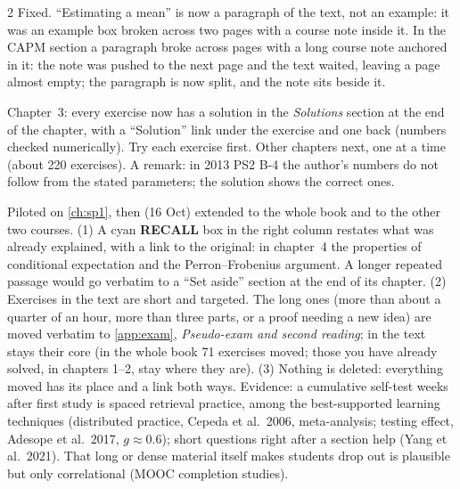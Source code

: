 \begin{paracol}{2}
{Fixed. ``Estimating a mean'' is now a paragraph of the text, not an example: it was an example box broken across two
pages with a course note inside it. In the CAPM section a paragraph broke across pages with a long course note
anchored in it: the note was pushed to the next page and the text waited, leaving a page almost empty; the
paragraph is now split, and the note sits beside it.}

{Chapter~3: every exercise now has a solution in the \emph{Solutions} section at the end of the chapter, with a
``Solution'' link under the exercise and one back (numbers checked numerically). Try each exercise first. Other
chapters next, one at a time (about 220 exercises). A remark: in 2013 PS2 B-4 the author's numbers do not follow
from the stated parameters; the solution shows the correct ones.}

{Piloted on \cref{ch:sp1}, then (16 Oct) extended to the whole book and to the other two courses.
(1) A cyan \textbf{RECALL} box in the right column restates what was already explained, with a link to the
original: in chapter~4 the properties of conditional expectation and the Perron--Frobenius argument. A longer
repeated passage would go verbatim to a ``Set aside'' section at the end of its chapter.
(2) Exercises in the text are short and targeted. The long ones (more than about a quarter of an hour, more than
three parts, or a proof needing a new idea) are moved verbatim to \cref{app:exam}, \emph{Pseudo-exam and second
reading}; in the text stays their core (in the whole book 71 exercises moved; those you have already solved, in chapters 1--2, stay where they are).
(3) Nothing is deleted: everything moved has its place and a link both ways.
Evidence: a cumulative self-test weeks after first study is spaced retrieval practice, among the best-supported
learning techniques (distributed practice, Cepeda et al.\ 2006, meta-analysis; testing effect, Adesope et al.\ 2017,
$g\approx0.6$); short questions right after a section help (Yang et al.\ 2021). That long or dense material itself
makes students drop out is plausible but only correlational (MOOC completion studies).}


\end{paracol}
